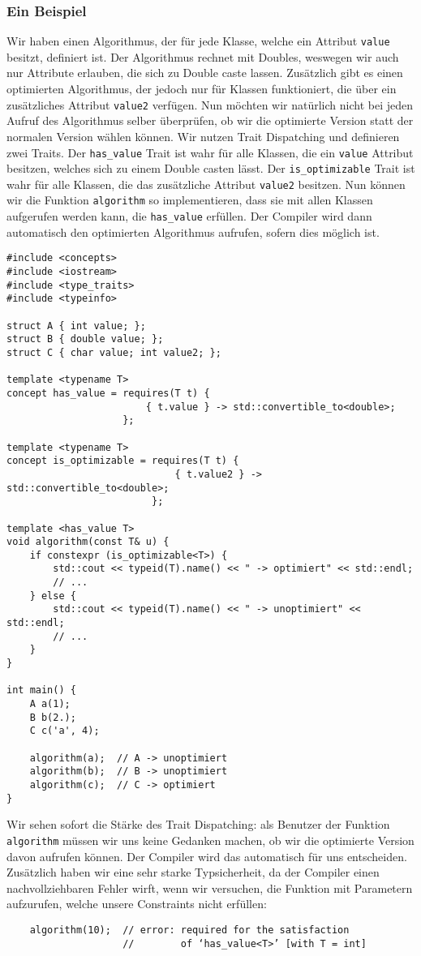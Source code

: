 \documentclass{article}
\begin{document}
\subsubsection*{Ein Beispiel}
Wir haben einen Algorithmus, der für jede Klasse, welche ein Attribut \verb"value" besitzt, definiert ist. Der Algorithmus rechnet mit Doubles, weswegen wir auch nur Attribute erlauben, die sich zu Double caste lassen. Zusätzlich gibt es einen optimierten Algorithmus, der jedoch nur für Klassen funktioniert, die über ein zusätzliches Attribut \verb"value2" verfügen. Nun möchten wir natürlich nicht bei jeden Aufruf des Algorithmus selber überprüfen, ob wir die optimierte Version statt der normalen Version wählen können. Wir nutzen Trait Dispatching und definieren zwei Traits. Der \verb"has_value" Trait ist wahr für alle Klassen, die ein \verb"value" Attribut besitzen, welches sich zu einem Double casten lässt. Der \verb"is_optimizable" Trait ist wahr für alle Klassen, die das zusätzliche Attribut \verb"value2" besitzen. Nun können wir die Funktion \verb"algorithm" so implementieren, dass sie mit allen Klassen aufgerufen werden kann, die \verb"has_value" erfüllen. Der Compiler wird dann automatisch den optimierten Algorithmus aufrufen, sofern dies möglich ist.
\begin{verbatim}
#include <concepts>
#include <iostream>
#include <type_traits>
#include <typeinfo>

struct A { int value; };
struct B { double value; };
struct C { char value; int value2; };

template <typename T>
concept has_value = requires(T t) {
                        { t.value } -> std::convertible_to<double>;
                    };

template <typename T>
concept is_optimizable = requires(T t) {
                             { t.value2 } -> std::convertible_to<double>;
                         };

template <has_value T>
void algorithm(const T& u) {
    if constexpr (is_optimizable<T>) {
        std::cout << typeid(T).name() << " -> optimiert" << std::endl;
        // ...
    } else {
        std::cout << typeid(T).name() << " -> unoptimiert" << std::endl;
        // ...
    }
}

int main() {
    A a(1);
    B b(2.);
    C c('a', 4);

    algorithm(a);  // A -> unoptimiert
    algorithm(b);  // B -> unoptimiert
    algorithm(c);  // C -> optimiert
}
\end{verbatim}
Wir sehen sofort die Stärke des Trait Dispatching: als Benutzer der Funktion \verb"algorithm" müssen wir uns keine Gedanken machen, ob wir die optimierte Version davon aufrufen können. Der Compiler wird das automatisch für uns entscheiden. Zusätzlich haben wir eine sehr starke Typsicherheit, da der Compiler einen nachvollziehbaren Fehler wirft, wenn wir versuchen, die Funktion mit Parametern aufzurufen, welche unsere Constraints nicht erfüllen:
\begin{verbatim}
    algorithm(10);  // error: required for the satisfaction 
                    //        of ‘has_value<T>’ [with T = int]
\end{verbatim}
\end{document}
